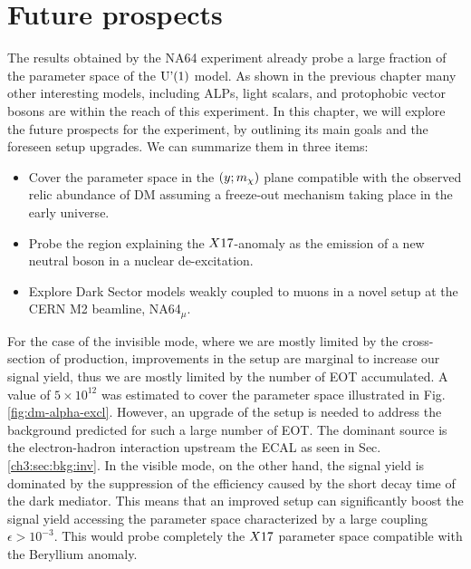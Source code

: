 
\newcommand{\pdirfive}{chapters/plots/chapter5}

\chapter{Future prospects}
\label{chapter5}

The results obtained by the NA64 experiment already probe a large fraction of the parameter space of the $\textrm{U'(1)}$ model. As shown in the previous chapter many other interesting models, including ALPs, light scalars, and protophobic vector bosons are within the reach of this experiment. In this chapter, we will explore the future prospects for the experiment, by outlining its main goals and the foreseen setup upgrades. We can summarize them in three items:

\begin{itemize}
\item Cover the parameter space in the $(y;m_{\chi})$ plane compatible with the observed relic abundance of DM assuming a freeze-out mechanism taking place in the early universe.
\item Probe the region explaining the $X17$-anomaly as the emission of a new neutral boson in a nuclear de-excitation.
\item Explore Dark Sector models weakly coupled to muons in a novel setup at the CERN M2 beamline, NA64$_{\mu}$.
\end{itemize}

For the case of the invisible mode, where we are mostly limited by the cross-section of production, improvements in the setup are marginal to increase our signal yield, thus we are mostly limited by the number of EOT accumulated. 
A value of $5 \times 10^{12}$ was estimated to cover the parameter space illustrated in Fig.\ref{fig:dm-alpha-excl}. However, an upgrade of the setup is needed to address the background predicted for such a large number of EOT. The dominant source is the electron-hadron interaction upstream the ECAL as seen in Sec.\ref{ch3:sec:bkg:inv}.
In the visible mode, on the other hand, the signal yield is dominated by the suppression of the efficiency caused by the short decay time of the dark mediator. This means that an improved setup can significantly boost the signal yield accessing the parameter space characterized by a large coupling $\epsilon > 10^{-3}$. This would probe completely the $X17$ parameter space compatible with the Beryllium anomaly.

